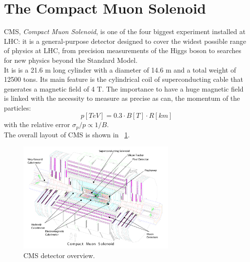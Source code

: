 \section{The Compact Muon Solenoid}
CMS, \textit{Compact Muon Solenoid}, is one of the four biggest experiment installed at LHC: it is a general-purpose detector designed to cover the widest possible range of physics at LHC, from precision measurements of the Higgs boson to searches for new physics beyond the Standard Model. \\
It is is a 21.6 m long cylinder with a diameter of 14.6 m and a total weight of 12500 tons. Its main feature is the cylindrical coil of superconducting cable that generates a magnetic field of 4 T. The importance to have a huge magnetic field is linked with the necessity to measure as precise as can, the momentum of the particles:
\begin{equation}
p[TeV] = 0.3 \cdot B[T] \cdot R[km]
\end{equation}
with the relative error  $\sigma_{p}/p \propto 1/B$. \\
The overall layout of CMS is shown in \figurename~\ref{CMS_Layout}.
\begin{figure}[htbp]
\centering
\includegraphics[width=0.7\textwidth]{Images/CMS_Layout.pdf}
\caption{CMS detector overview.}
\label{CMS_Layout}
\end{figure}






